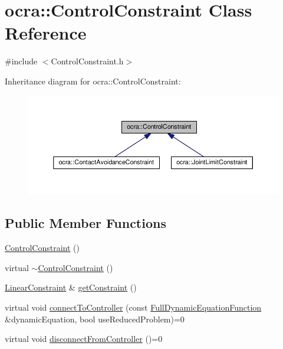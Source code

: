 \hypertarget{classocra_1_1ControlConstraint}{}\section{ocra\+:\+:Control\+Constraint Class Reference}
\label{classocra_1_1ControlConstraint}


{\ttfamily \#include $<$Control\+Constraint.\+h$>$}



Inheritance diagram for ocra\+:\+:Control\+Constraint\+:
\nopagebreak
\begin{figure}[H]
\begin{center}
\leavevmode
\includegraphics[width=350pt]{de/dd8/classocra_1_1ControlConstraint__inherit__graph}
\end{center}
\end{figure}
\subsection*{Public Member Functions}
\begin{DoxyCompactItemize}
\item 
\hyperlink{classocra_1_1ControlConstraint_a3d911f350d6a51009b670dcf061ab93e}{Control\+Constraint} ()
\item 
virtual \hyperlink{classocra_1_1ControlConstraint_a49f1eb50f143ef0e438d3af43db9eb31}{$\sim$\+Control\+Constraint} ()
\item 
\hyperlink{namespaceocra_ae8b87cf4099be3efc3b410019ad2046e}{Linear\+Constraint} \& \hyperlink{classocra_1_1ControlConstraint_a41b7568bc59441ca8d115e7ccf613658}{get\+Constraint} ()
\item 
virtual void \hyperlink{classocra_1_1ControlConstraint_a04dabdc1c469146e7b3240dfe0a5172c}{connect\+To\+Controller} (const \hyperlink{classocra_1_1FullDynamicEquationFunction}{Full\+Dynamic\+Equation\+Function} \&dynamic\+Equation, bool use\+Reduced\+Problem)=0
\item 
virtual void \hyperlink{classocra_1_1ControlConstraint_adbd15b36773c775a06a0b7bde46ec799}{disconnect\+From\+Controller} ()=0
\end{DoxyCompactItemize}
